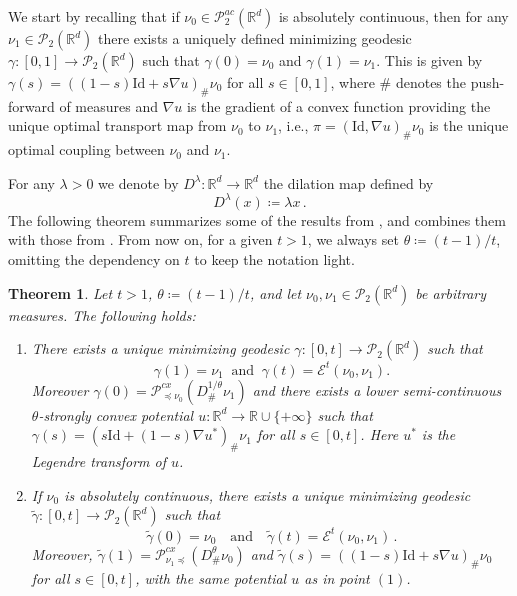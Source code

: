 \documentclass[12pt]{amsart}
\def\mc#1{\mathcal{#1}}
\newtheorem{theorem}{Theorem}
\begin{document}
We start by recalling that if $\nu_0 \in \mc{P}_2^{ac}(\mathbb{R}^d)$ is absolutely continuous, then for any $\nu_1 \in \mc{P}_2(\mathbb{R}^d)$ there exists a uniquely defined minimizing geodesic $\gamma:[0,1]\rightarrow \mc{P}_2(\mathbb{R}^d)$ such that  $\gamma(0)=\nu_0$ and $\gamma(1) =\nu_1$. This is given by $\gamma(s) = ( (1-s)\mathrm{Id} + s \nabla u)_\# \nu_0$ for all $s\in[0,1]$, where $\#$ denotes the push-forward of measures and $\nabla u$ is the gradient of a convex function providing the unique optimal transport map from $\nu_0$ to $\nu_1$, i.e., $\pi =(\mathrm{Id}, \nabla u)_\# \nu_0$ is the unique optimal coupling between $\nu_0$ and $\nu_1$.

For any $\lambda>0$ we denote by $D^\lambda :\mathbb{R}^d\rightarrow \mathbb{R}^d$ the dilation map defined by
\[
D^\lambda(x) \coloneqq \lambda x\,.
\]
The following theorem summarizes some of the results from \cite{Gallouet2025}, and combines them with those from \cite{alfonsi2020sampling,gozlan2020mixture,kim2024backward}.  From now on, for a given $t>1$, we always set $\theta\coloneqq (t-1)/t$, omitting the dependency on $t$ to keep the notation light.
\begin{theorem}\label{th:projextra} Let $t>1$, 
$\theta \coloneqq (t-1)/t$, and let $\nu_0,\nu_1\in \mc{P}_2(\mathbb{R}^d)$  be arbitrary measures. The following holds:
\begin{enumerate}
    \item There exists a unique minimizing geodesic $\gamma:[0,t] \rightarrow \mc{P}_2(\mathbb{R}^d)$ such that \[
    \gamma(1) = \nu_1~\text{ and }~\gamma(t) = \mathscr{E}^t(\nu_0,\nu_1) .\]
    Moreover $\gamma(0) = \mathscr{P}^{cx}_{\preceq \nu_0}(D^{1/\theta}_\# \nu_1)$  and there exists a lower semi-continuous $\theta$-strongly convex potential $u:\mathbb{R}^d \rightarrow \mathbb{R} \cup \{+\infty\}$ such that $\gamma(s) = (s\mathrm{Id}+ (1-s)\nabla u^*)_\#\nu_1$ for all $s\in[0,t]$. 
    { Here $u^*$ is the Legendre transform of $u$.}

  

\item If  $\nu_0$ is absolutely continuous, there exists a unique minimizing geodesic $\tilde{\gamma}:[0,t]\rightarrow \mc{P}_2(\mathbb{R}^d)$ such that
\[
\tilde{\gamma}(0)=\nu_0 \quad \text{and}\quad \tilde{\gamma}(t) = \mathscr{E}^t(\nu_0,\nu_1)\,.
\]
Moreover,  $\tilde{\gamma}(1) = \mathscr{P}^{cx}_{\nu_1 \preceq}(D^\theta_\#\nu_0)$ and $\tilde{\gamma}(s) = ((1-s)\mathrm{Id}+ s\nabla u)_\#\nu_0$ for all $s\in[0,t]$, with the same potential $u$ as in point $(1)$.    
\end{enumerate}
\end{theorem}
\end{document}

